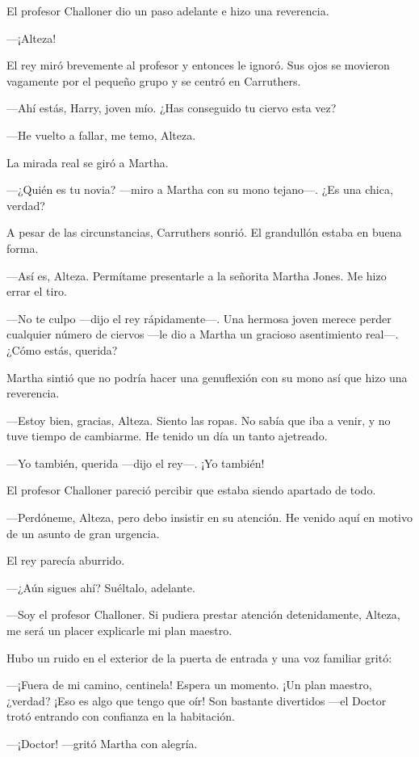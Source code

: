 El profesor Challoner dio un paso adelante e hizo una reverencia.

---¡Alteza!

El rey miró brevemente al profesor y entonces le ignoró. Sus ojos se
movieron vagamente por el pequeño grupo y se centró en Carruthers.

---Ahí estás, Harry, joven mío. ¿Has conseguido tu ciervo esta vez?

---He vuelto a fallar, me temo, Alteza.

La mirada real se giró a Martha.

---¿Quién es tu novia? ---miro a Martha con su mono tejano---. ¿Es una
chica, verdad?

A pesar de las circunstancias, Carruthers sonrió. El grandullón estaba
en buena forma.

---Así es, Alteza. Permítame presentarle a la señorita Martha Jones. Me
hizo errar el tiro.

---No te culpo ---dijo el rey rápidamente---. Una hermosa joven merece
perder cualquier número de ciervos ---le dio a Martha un gracioso
asentimiento real---. ¿Cómo estás, querida?

Martha sintió que no podría hacer una genuflexión con su mono así que
hizo una reverencia.

---Estoy bien, gracias, Alteza. Siento las ropas. No sabía que iba a
venir, y no tuve tiempo de cambiarme. He tenido un día un tanto
ajetreado.

---Yo también, querida ---dijo el rey---. ¡Yo también!

El profesor Challoner pareció percibir que estaba siendo apartado de
todo.

---Perdóneme, Alteza, pero debo insistir en su atención. He venido aquí
en motivo de un asunto de gran urgencia.

El rey parecía aburrido.

---¿Aún sigues ahí? Suéltalo, adelante.

---Soy el profesor Challoner. Si pudiera prestar atención detenidamente,
Alteza, me será un placer explicarle mi plan maestro.

Hubo un ruido en el exterior de la puerta de entrada y una voz familiar
gritó:

---¡Fuera de mi camino, centinela! Espera un momento. ¡Un plan maestro,
¿verdad? ¡Eso es algo que tengo que oír! Son bastante divertidos ---el
Doctor trotó entrando con confianza en la habitación.

---¡Doctor! ---gritó Martha con alegría.

